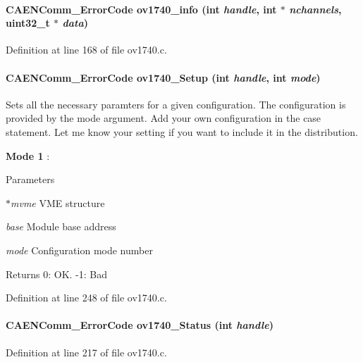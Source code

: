 \paragraph[{ov1740\_\-info}]{\setlength{\rightskip}{0pt plus 5cm}CAENComm\_\-ErrorCode ov1740\_\-info (int {\em handle}, \/  int $\ast$ {\em nchannels}, \/  uint32\_\-t $\ast$ {\em data})}\hfill\label{ov1740_8c_a69ac1d4b3d97aec1e9f5fd51bfd0dc84}


Definition at line 168 of file ov1740.c.
\paragraph[{ov1740\_\-Setup}]{\setlength{\rightskip}{0pt plus 5cm}CAENComm\_\-ErrorCode ov1740\_\-Setup (int {\em handle}, \/  int {\em mode})}\hfill\label{ov1740_8c_a37458e8b4bbc712076b0b1e15c5241e9}
Sets all the necessary paramters for a given configuration. The configuration is provided by the mode argument. Add your own configuration in the case statement. Let me know your setting if you want to include it in the distribution.
\begin{DoxyItemize}
\item {\bfseries Mode 1} :
\end{DoxyItemize}


\begin{DoxyParams}{Parameters}
\item[{\em $\ast$mvme}]VME structure \item[{\em base}]Module base address \item[{\em mode}]Configuration mode number \end{DoxyParams}
\begin{DoxyReturn}{Returns}
0: OK. -\/1: Bad 
\end{DoxyReturn}


Definition at line 248 of file ov1740.c.
\paragraph[{ov1740\_\-Status}]{\setlength{\rightskip}{0pt plus 5cm}CAENComm\_\-ErrorCode ov1740\_\-Status (int {\em handle})}\hfill\label{ov1740_8c_ab985a5d9bfa3b1445514bada1a1303c3}


Definition at line 217 of file ov1740.c.

